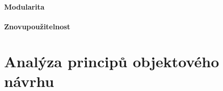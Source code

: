 \paragraph{Modularita} %
\paragraph{Znovupoužitelnost} %

\section{Analýza principů objektového návrhu}





